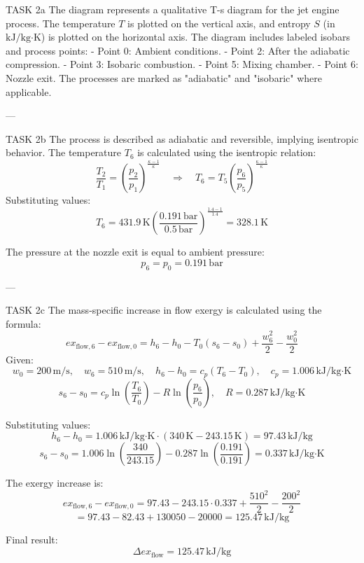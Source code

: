 TASK 2a  
The diagram represents a qualitative T-s diagram for the jet engine process. The temperature \( T \) is plotted on the vertical axis, and entropy \( S \) (in \( \text{kJ}/\text{kg·K} \)) is plotted on the horizontal axis. The diagram includes labeled isobars and process points:  
- Point 0: Ambient conditions.  
- Point 2: After the adiabatic compression.  
- Point 3: Isobaric combustion.  
- Point 5: Mixing chamber.  
- Point 6: Nozzle exit.  
The processes are marked as "adiabatic" and "isobaric" where applicable.

---

TASK 2b  
The process is described as adiabatic and reversible, implying isentropic behavior. The temperature \( T_6 \) is calculated using the isentropic relation:  
\[
\frac{T_2}{T_1} = \left( \frac{p_2}{p_1} \right)^{\frac{\kappa - 1}{\kappa}} \quad \Rightarrow \quad T_6 = T_5 \left( \frac{p_6}{p_5} \right)^{\frac{\kappa - 1}{\kappa}}
\]  
Substituting values:  
\[
T_6 = 431.9 \, \text{K} \left( \frac{0.191 \, \text{bar}}{0.5 \, \text{bar}} \right)^{\frac{1.4 - 1}{1.4}} = 328.1 \, \text{K}
\]  

The pressure at the nozzle exit is equal to ambient pressure:  
\[
p_6 = p_0 = 0.191 \, \text{bar}
\]  

---

TASK 2c  
The mass-specific increase in flow exergy is calculated using the formula:  
\[
ex_{\text{flow},6} - ex_{\text{flow},0} = h_6 - h_0 - T_0 (s_6 - s_0) + \frac{w_6^2}{2} - \frac{w_0^2}{2}
\]  
Given:  
\[
w_0 = 200 \, \text{m/s}, \quad w_6 = 510 \, \text{m/s}, \quad h_6 - h_0 = c_p (T_6 - T_0), \quad c_p = 1.006 \, \text{kJ}/\text{kg·K}
\]  
\[
s_6 - s_0 = c_p \ln \left( \frac{T_6}{T_0} \right) - R \ln \left( \frac{p_6}{p_0} \right), \quad R = 0.287 \, \text{kJ}/\text{kg·K}
\]  

Substituting values:  
\[
h_6 - h_0 = 1.006 \, \text{kJ}/\text{kg·K} \cdot (340 \, \text{K} - 243.15 \, \text{K}) = 97.43 \, \text{kJ}/\text{kg}
\]  
\[
s_6 - s_0 = 1.006 \ln \left( \frac{340}{243.15} \right) - 0.287 \ln \left( \frac{0.191}{0.191} \right) = 0.337 \, \text{kJ}/\text{kg·K}
\]  

The exergy increase is:  
\[
ex_{\text{flow},6} - ex_{\text{flow},0} = 97.43 - 243.15 \cdot 0.337 + \frac{510^2}{2} - \frac{200^2}{2}
\]  
\[
= 97.43 - 82.43 + 130050 - 20000 = 125.47 \, \text{kJ}/\text{kg}
\]  

Final result:  
\[
\Delta ex_{\text{flow}} = 125.47 \, \text{kJ}/\text{kg}
\]